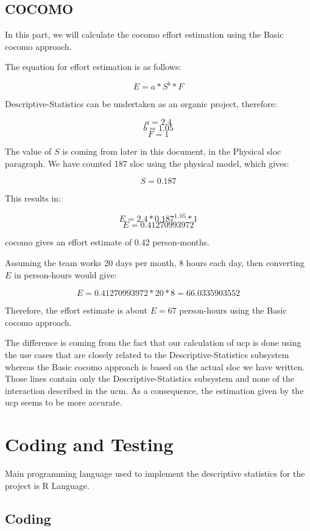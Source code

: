 \documentclass[11pt]{article}
\begin{document}
\newpage

\subsection{COCOMO}

In this part, we will calculate the \gls{cocomo} effort estimation using the Basic \gls{cocomo} approach.

The equation for effort estimation is as follows:

$$ E = a*S^b*F $$ 

Descriptive-Statistics can be undertaken as an organic project, therefore:

$$ a = 2.4 $$
$$ b = 1.05 $$
$$ F = 1 $$

The value of $ S $ is coming from later in this document, in the Physical \gls{sloc} paragraph. We have counted 187 \gls{sloc} using the physical model, which gives:

$$ S = 0.187 $$

This results in:

$$ E = 2.4*0.187^{1,05}*1 $$ 
$$ E = 0.41270993972 $$ 

\gls{cocomo} gives an effort estimate of 0.42 person-months.

Assuming the team works 20 days per month, 8 hours each day, then converting $ E $ in person-hours would give:

$$ E = 0.41270993972 * 20 * 8 = 66.0335903552 $$

Therefore, the effort estimate is about $ E = 67 $ person-hours using the Basic \gls{cocomo} approach.\newline

The difference is coming from the fact that our calculation of \gls{ucp} is done using the use cases that are closely related to the Descriptive-Statistics subsystem whereas the Basic \gls{cocomo} approach is based on the actual \gls{sloc} we have written. Those lines contain only the Descriptive-Statistics subsystem and none of the interaction described in the \gls{ucm}. As a consequence, the estimation given by the \gls{ucp} seems to be more accurate.
\newpage

\section{Coding and Testing}
Main programming language used to implement the descriptive statistics for the project is R Language.
\subsection{Coding}
\end{document}
